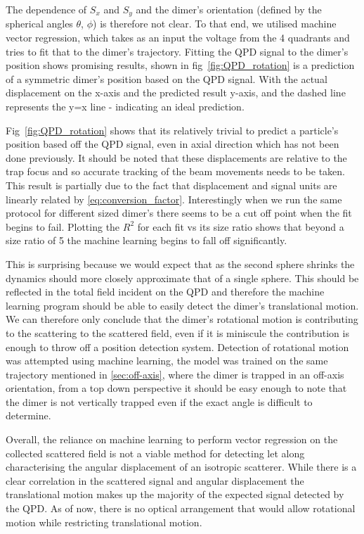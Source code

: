The dependence of $S_x$ and $S_y$ and the dimer's orientation
(defined by the spherical angles $\theta$, $\phi$) is therefore
not clear. To that end, we utilised machine vector regression,
which takes as an input the voltage from the 4 quadrants and 
tries to fit that to the dimer's trajectory. Fitting the QPD
signal to the dimer's position shows promising results, shown in
fig~\ref{fig:QPD_rotation} is a prediction of a symmetric dimer's 
position based on the QPD signal. With the actual displacement 
on the x-axis and the predicted result y-axis, and the dashed 
line represents the y=x line - indicating an ideal prediction. 

Fig~\ref{fig:QPD_rotation} shows that its relatively trivial 
to predict a particle's position based off the QPD signal, even 
in axial direction which has not been done previously. It should 
be noted that these displacements are relative to the trap focus 
and so accurate tracking of the beam movements needs to be taken. 
This result is partially due to the fact that displacement and 
signal units are linearly related by \eqref{eq:conversion_factor}. Interestingly when we run the same protocol for different sized 
dimer's there seems to be a cut off point when the fit begins to 
fail. Plotting the $R^2$ for each fit vs its size ratio shows 
that beyond a size ratio of 5 the machine learning begins to fall 
off significantly. 

This is surprising because we would expect that as the second 
sphere shrinks the dynamics should more closely approximate that 
of a single sphere. This should be reflected in the total field
incident on the QPD and therefore the machine learning program 
should be able to easily detect the dimer's translational motion.
We can therefore only conclude that the dimer's rotational motion
is contributing to the scattering to the scattered field, even if
it is miniscule the contribution is enough to throw off a 
position detection system. Detection of rotational motion was 
attempted using machine learning, the model was trained on the 
same trajectory mentioned in \ref{sec:off-axis}, where the dimer 
is trapped in an off-axis orientation, from a top down perspective
it should be easy enough to note that the dimer is not vertically 
trapped even if the exact angle is difficult to determine. 

Overall, the reliance on machine learning to perform vector 
regression on the collected scattered field is not a viable 
method for detecting let along characterising the angular 
displacement of an isotropic scatterer. While there is a 
clear correlation in the scattered signal and angular 
displacement the translational motion makes up the majority 
of the expected signal detected by the QPD. As of now, there
is no optical arrangement that would allow rotational motion 
while restricting translational motion. 

